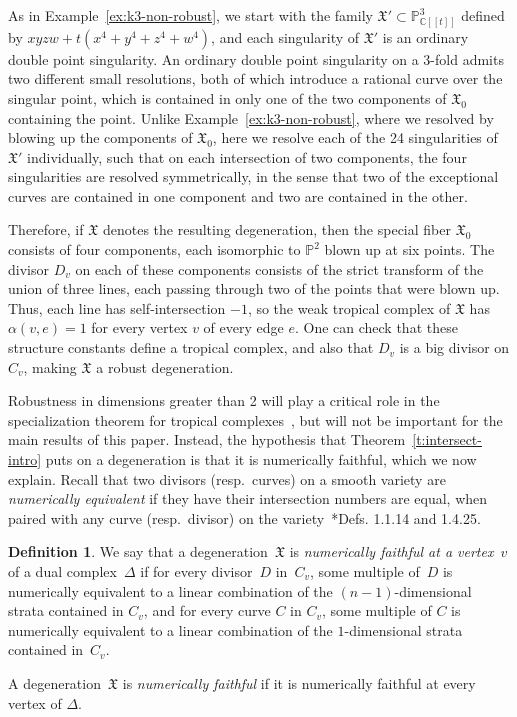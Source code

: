 \documentclass[11pt,reqno]{amsart}
\theoremstyle{definition}
\newtheorem{defn}[thm]{Definition}
\newcommand{\CC}{\mathbb C}
\newcommand{\defi}[1]{\emph{#1}}
\newcommand{\PP}{\mathbb P}
\newcommand{\X}{\mathfrak X}
\begin{document}
\begin{ex}\label{ex:k3-robust}
As in Example~\ref{ex:k3-non-robust}, we start with the family $\X'
\subset \PP^3_{\CC[[t]]}$ defined by $xyzw + t(x^4 + y^4 + z^4 + w^4)$, and each
singularity of $\X'$ is an ordinary double point singularity.
An ordinary double point singularity on a 3-fold admits two different small resolutions, both of
which introduce a rational curve over the singular point, which is contained in
only one of the two components of $\X_0$ containing the point. Unlike
Example~\ref{ex:k3-non-robust}, where we resolved by blowing up the components
of $\X_0$, here we resolve each of the 24 singularities of $\X'$ individually,
such that on each intersection of two components, the four singularities are
resolved symmetrically, in the sense that two of the exceptional curves are
contained in one component and two are contained in the other.

Therefore, if $\X$ denotes the resulting degeneration, then the special fiber
$\X_0$ consists of four components, each isomorphic to $\PP^2$ blown up at six
points. The divisor $D_v$ on each of these components consists of the strict
transform of the union of three lines, each passing through two of the points
that were blown up. Thus, each line has self-intersection $-1$, so the weak
tropical complex of $\X$ has $\alpha(v,e) = 1$ for every vertex $v$ of every
edge $e$. One can check that these structure constants define a tropical
complex, and also that $D_v$ is a big divisor on $C_v$, making $\X$ a robust
degeneration.
\end{ex}

Robustness in dimensions greater than 2 will play a critical role in the
specialization theorem for tropical complexes~\cite{cartwright-specialization},
but will not be important for the main results of this paper. Instead, the
hypothesis that Theorem~\ref{t:intersect-intro} puts on a degeneration is that
it is numerically faithful, which we now explain. Recall that two divisors
(resp.\ curves) on a smooth variety are \defi{numerically equivalent} if they
have their intersection numbers are equal, when paired with any curve (resp.\
divisor) on the variety~\cite{lazarsfeld}*{Defs. 1.1.14 and 1.4.25}.

\begin{defn}\label{d:numerically-faithful}
We say that a degeneration~$\X$ is \defi{numerically faithful at a
vertex~$v$} of a dual complex~$\Delta$ if for every divisor~$D$ in~$C_v$, some
multiple of~$D$ is numerically equivalent to a linear combination of the
$(n-1)$-dimensional strata contained in $C_v$, and for every curve
$C$ in $C_v$, some multiple of $C$ is numerically equivalent to a linear
combination of the $1$-dimensional strata contained in~$C_v$.

A degeneration~$\X$ is \defi{numerically faithful} if it is numerically
faithful at every vertex of $\Delta$.
\end{defn}
\end{document}
